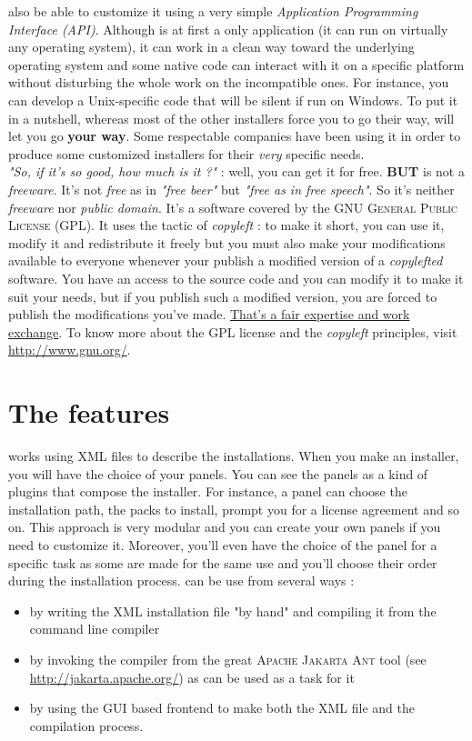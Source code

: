 also be able to customize it using a very simple \textit{Application Programming
Interface (API)}. Although \IzPack is at first a \Java only application (it
can run on virtually any operating system), it can work in a clean way toward
the underlying operating system and some native code can interact with it on a
specific platform without disturbing the whole work on the incompatible ones.
For instance, you can develop a Unix-specific code that will be silent if run on
Windows. To put it in a nutshell, whereas most of the other \Java installers
force you to go their way, \IzPack will let you go \textbf{your way}. Some
respectable companies have been using it in order to produce some customized 
installers for their \textsl{very} specific needs.\\

\textit{"So, if it's so good, how much is it ?"} : well, you can get it for free.
\textbf{BUT} \IzPack is not a \textit{freeware}. It's not \textit{free} as in
\textit{"free beer"} but \textit{"free as in free speech"}. So it's neither
\textit{freeware} nor \textit{public domain}. It's a software covered by the
\textsc{GNU General Public License} (GPL). It uses the tactic of
\textit{copyleft} : to make it short, you can use it, modify it and redistribute
it freely but you must also make your modifications available to everyone
whenever your publish a modified version of a \textit{copylefted} software. You
have an access to the \IzPack source code and you can modify it to make it suit
your needs, but if you publish such a modified version, you are forced to
publish the modifications you've made. \underline{That's a fair expertise and 
work exchange}. To know more about the GPL license and the \textit{copyleft}
principles, visit \mbox{\url{http://www.gnu.org/}}.\\

\section*{The features}

\IzPack works using XML files to describe the installations. When you make an
installer, you will have the choice of your panels. You can see the panels as
a kind of plugins that compose the installer. For instance, a panel can choose
the installation path, the packs to install, prompt you for a license agreement
and so on. This approach is very modular and you can create your own panels if
you need to customize it. Moreover, you'll even have the choice of the panel for
a specific task as some are made for the same use and you'll choose their order
during the installation process. \IzPack can be use from several ways :
\begin{itemize}
	\item by writing the XML installation file "by hand" and compiling it from the
	command line compiler
	\item by invoking the compiler from the great \textsc{Apache Jakarta Ant} tool
	(see \url{http://jakarta.apache.org/}) as \IzPack can be used as a task for it
	\item by using the GUI based frontend to make both the XML file and the
	compilation process.
\end{itemize}\

